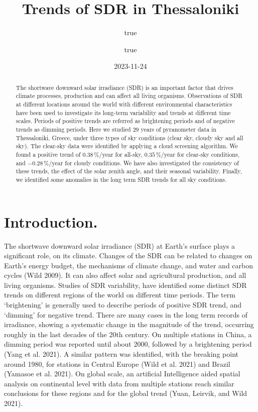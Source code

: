 \documentclass[
  preprint, 3p, authoryear]{article}
\title{Trends of SDR in Thessaloniki}
\author{true \and true}
\date{2023-11-24}
\begin{document}
\maketitle
\begin{abstract}
The shortwave downward solar irradiance (SDR) is an important factor that drives climate processes, production and can affect all living organisms.
Observations of SDR at different locations around the world with different environmental characteristics have been used to investigate its long-term variability and trends at different time scales.
Periods of positive trends are referred as brightening periods and of negative trends as dimming periods.
Here we studied 29 years of pyranometer data in Thessaloniki, Greece, under three types of sky conditions (clear sky, cloudy sky and all sky).
The clear-sky data were identified by applying a cloud screening algorithm. We found a positive trend of \(0.38\,\%/\text{year}\) for all-sky, \(0.35\,\%/\text{year}\) for clear-sky conditions, and \(-0.28\,\%/\text{year}\) for cloudy conditions.
We have also investigated the consistency of these trends, the effect of the solar zenith angle, and their seasonal variability.
Finally, we identified some anomalies in the long term SDR trends for all sky conditions.
\end{abstract}

\hypertarget{introduction.}{%
\section{Introduction.}\label{introduction.}}

The shortwave downward solar irradiance (SDR) at Earth's surface plays a significant role, on its climate.
Changes of the SDR can be related to changes on Earth's energy budget, the mechanisms of climate change, and water and carbon cycles (Wild 2009).
It can also affect solar and agricultural production, and all living organisms.
Studies of SDR variability, have identified some distinct SDR trends on different regions of the world on different time periods.
The term `brightening' is generally used to describe periods of positive SDR trend, and `dimming' for negative trend.
There are many cases in the long term records of irradiance, showing a systematic change in the magnitude of the trend, occurring roughly in the last decades of the 20th century.
On multiple stations in China, a dimming period was reported until about 2000, followed by a brightening period (Yang et al. 2021).
A similar pattern was identified, with the breaking point around 1980, for stations in Central Europe (Wild et al. 2021) and Brazil (Yamasoe et al. 2021).
On global scale, an artificial Intelligence aided spatial analysis on continental level with data from multiple stations reach similar conclusions for these regions and for the global trend (Yuan, Leirvik, and Wild 2021).
\end{document}
